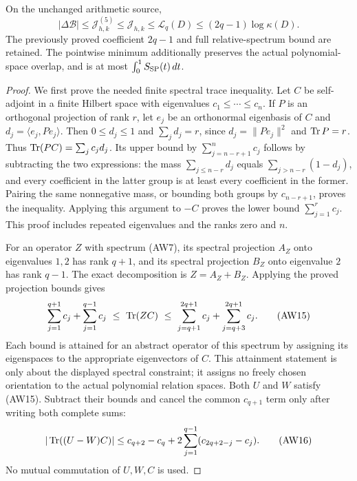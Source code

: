 \begin{theorem}
On the unchanged arithmetic source,
\[
 |\Delta\mathcal B|\le\mathcal J_{h,k}^{(5)}\le\mathcal J_{h,k}\le\mathcal L_q(D)
                  \le(2q-1)\log\kappa(D).
 \tag{AW14}
\]
The previously proved coefficient $2q-1$ and full relative-spectrum
bound are retained. The pointwise minimum additionally preserves the
actual polynomial-space overlap, and is at most $\int_0^1S_{\rm SP}(t)\,dt$.
\end{theorem}
\begin{proof}
We first prove the needed finite spectral trace inequality.
Let $C$ be self-adjoint in a finite Hilbert space with eigenvalues
$c_1\le\cdots\le c_n$. If $P$ is an orthogonal projection of
rank $r$, let $e_j$ be an orthonormal eigenbasis of $C$ and
$d_j=\langle e_j,Pe_j\rangle$. Then $0\le d_j\le1$ and
$\sum_jd_j=r$, since $d_j=\|Pe_j\|^2$ and $\operatorname{Tr} P=r$.
Thus $\operatorname{Tr}(PC)=\sum_jc_jd_j$.
Its upper bound by $\sum_{j=n-r+1}^n c_j$ follows by subtracting
the two expressions: the mass $\sum_{j\le n-r}d_j$ equals
$\sum_{j>n-r}(1-d_j)$, and every coefficient in the latter
group is at least every coefficient in the former. Pairing the
same nonnegative mass, or bounding both groups by $c_{n-r+1}$,
proves the inequality. Applying this argument to $-C$ proves
the lower bound $\sum_{j=1}^r c_j$. This proof includes repeated
eigenvalues and the ranks zero and $n$.

For an operator $Z$ with spectrum (AW7), its spectral projection
$A_Z$ onto eigenvalues $1,2$ has rank $q+1$, and its spectral
projection $B_Z$ onto eigenvalue $2$ has rank $q-1$.
The exact decomposition is $Z=A_Z+B_Z$. Applying the proved
projection bounds gives
\[
 \sum_{j=1}^{q+1}c_j+\sum_{j=1}^{q-1}c_j
 \ \le\ \operatorname{Tr}(ZC)\ \le\
 \sum_{j=q+1}^{2q+1}c_j+\sum_{j=q+3}^{2q+1}c_j.
 \tag{AW15}
\]
Each bound is attained for an abstract operator of this spectrum
by assigning its eigenspaces to the appropriate eigenvectors
of $C$. This attainment statement is only about the displayed
spectral constraint; it assigns no freely chosen orientation
to the actual polynomial relation spaces.
Both $U$ and $W$ satisfy (AW15). Subtract their bounds and cancel
the common $c_{q+1}$ term only after writing both complete sums:
\[
 |\operatorname{Tr}((U-W)C)|
 \le c_{q+2}-c_q
       +2\sum_{j=1}^{q-1}(c_{2q+2-j}-c_j).
 \tag{AW16}
\]
No mutual commutation of $U,W,C$ is used.


\end{proof}
